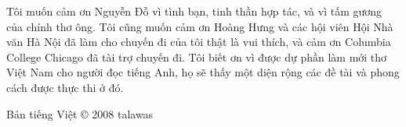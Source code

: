 \documentclass[../main.tex]{subfiles}
\begin{document}
\begin{multicols}{2}
Tôi muốn cảm ơn Nguyễn Đỗ vì tình bạn, tinh thần hợp tác, và vì tấm gương của chính thơ ông. Tôi cũng muốn cảm ơn Hoàng Hưng và các hội viên Hội Nhà văn Hà Nội đã làm cho chuyến đi của tôi thật là vui thích, và cảm ơn Columbia College Chicago đã tài trợ chuyến đi. Tôi biết ơn vì được dự phần làm mới thơ Việt Nam cho người đọc tiếng Anh, họ sẽ thấy một diện rộng các đề tài và phong cách được thực thi ở đó. 
 
 
Bản tiếng Việt © 2008 talawas



\end{multicols}
\end{document}
